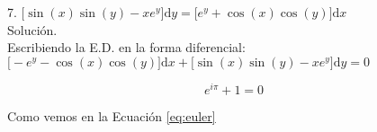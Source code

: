 \documentclass{article}
\begin{document}
    7. $ \big [\sin (x) \sin (y) - xe^y \big ] \mathrm{d}y = \big [e^y + \cos (x) \cos(y) \big ] \mathrm{d}x $ \\

    \hspace{4 mm} Solución. \\

    Escribiendo la E.D. en la forma diferencial: \\

    $ \big [-e^y - \cos (x) \cos(y) \big ] \mathrm{d}x + \big [\sin (x) \sin (y) - xe^y \big ] \mathrm{d}y = 0 $



    \begin{equation}
        e^{i\pi} + 1 = 0
        \label{eq:euler}
    \end{equation}
        
    Como vemos en la Ecuación \ref{eq:euler}
        
\end{document}
